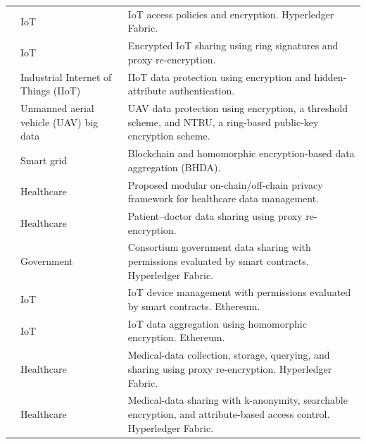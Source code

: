 \begin{longtable}{@{}>{\raggedright\arraybackslash}m{}>{\raggedright\arraybackslash}m{}>{\raggedright\arraybackslash}m{}@{}}
\addlinespace[5pt]
\cite{2021-privacy-fog-iot} & IoT & IoT access policies and encryption. Hyperledger Fabric. \\
\addlinespace[5pt]
\cite{2021-data-priv-iot} & IoT & Encrypted IoT sharing using ring signatures and proxy re-encryption. \\
\addlinespace[5pt]
\cite{2021-data-sec-sharing} & Industrial Internet of Things (IIoT) & IIoT data protection using encryption and hidden-attribute authentication. \\
\addlinespace[5pt]
\cite{2021-drone-big-data} & Unmanned aerial vehicle (UAV) big data & UAV data protection using encryption, a threshold scheme, and NTRU, a ring-based public-key encryption scheme. \\
\addlinespace[5pt]
\cite{2021-homomo-enc-smart-grid} & Smart grid & Blockchain and homomorphic encryption-based data aggregation (BHDA). \\
\addlinespace[5pt]
\cite{2021-hOCBS} & Healthcare & Proposed modular on-chain/off-chain privacy framework for healthcare data management. \\
\addlinespace[5pt]
\cite{2021-sp-chain} & Healthcare & Patient--doctor data sharing using proxy re-encryption. \\
\addlinespace[5pt]
\cite{2021-priv-gov-soc} & Government & Consortium government data sharing with permissions evaluated by smart contracts. Hyperledger Fabric. \\
\addlinespace[5pt]
\cite{2021-data-privacy-based-iot} & IoT & IoT device management with permissions evaluated by smart contracts. Ethereum. \\
\addlinespace[5pt]
\cite{2021-priv-iot-homo} & IoT & IoT data aggregation using homomorphic encryption. Ethereum. \\
\addlinespace[5pt]
\cite{2021-system-medical-data-privacy} & Healthcare & Medical-data collection, storage, querying, and sharing using proxy re-encryption. Hyperledger Fabric. \\
\addlinespace[5pt]
\cite{2021-medical-data-sharing} & Healthcare & Medical-data sharing with k-anonymity, searchable encryption, and attribute-based access control. Hyperledger Fabric. \\
\end{longtable}

